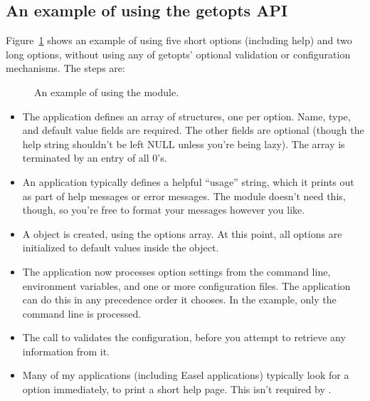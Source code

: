 \subsection{An example of using the getopts API}

Figure~\ref{fig:getopts_example} shows an example of using five short
options (including help) and two long options, without using any of
getopts' optional validation or configuration mechanisms. The steps
are:

\begin{figure}

\caption{An example of using the  module.}
\label{fig:getopts_example}
\end{figure}

\begin{itemize}
\item The application defines an array of 
      structures, one per option. Name, type, and default value fields
      are required. The other fields are optional (though the help
      string shouldn't be left NULL unless you're being lazy). The
      array is terminated by an entry of all 0's.

\item An application typically defines a helpful ``usage'' string,
      which it prints out as part of help messages or error messages.
      The  module doesn't need this, though, so you're
      free to format your messages however you like.

\item A  object is created, using the options
      array. At this point, all options are initialized to default
      values inside the object.

\item The application now processes option settings from the command
      line, environment variables, and one or more configuration
      files. The application can do this in any precedence order it
      chooses. In the example, only the command line is processed.
 
\item The call to  validates the
      configuration, before you attempt to retrieve any information
      from it.

\item Many of my applications (including Easel applications) typically
      look for a  option immediately, to print a short help
      page. This isn't required by .


\end{itemize}
